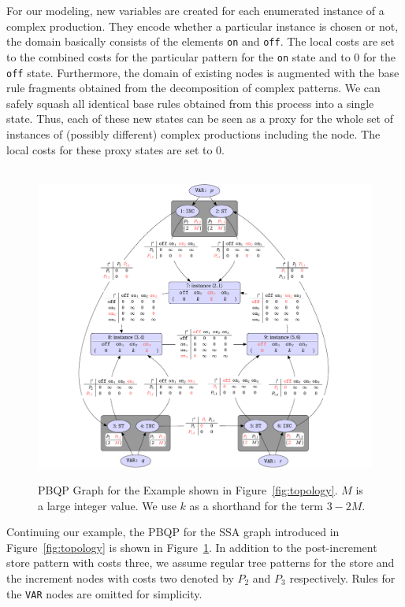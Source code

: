 For our modeling, new variables are created for each enumerated
instance of a complex production. They encode whether a particular
instance is chosen or not, \ie the domain basically consists of the
elements \texttt{on} and \texttt{off}. The local costs are set to the
combined costs for the particular pattern for the \texttt{on} state
and to 0 for the \texttt{off} state. Furthermore, the domain of
existing nodes is augmented with the base rule fragments obtained from
the decomposition of complex patterns.  We can safely squash all
identical base rules obtained from this process into a single
state. Thus, each of these new states can be seen as a proxy for the
whole set of instances of (possibly different) complex productions
including the node. The local costs for these proxy states are set to 0.

\begin{figure}
  \centering
    ~\hspace{-2cm}\includegraphics[width=1.33\textwidth]{pgf-fig009}
  \caption{PBQP Graph for the Example shown in
    Figure~\ref{fig:topology}. $M$ is a large integer value. We use $k$ as a shorthand for the term
    $3-2M$.}\label{fig:pbqpinst}
\end{figure}

Continuing our example, the PBQP for the SSA graph introduced in
Figure~\ref{fig:topology} is shown in Figure~\ref{fig:pbqpinst}. In
addition to the post-increment store pattern with costs three, we assume
regular tree patterns for the store and the increment nodes with costs
two denoted by $P_2$ and $P_3$ respectively. Rules for the
\texttt{VAR} nodes are omitted for simplicity.

